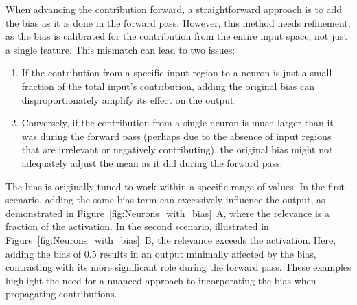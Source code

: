 When advancing the contribution forward, a straightforward approach is to add the bias as it is done in the forward pass. However, this method needs refinement, as the bias is calibrated for the contribution from the entire input space, not just a single feature. This mismatch can lead to two issues:
\begin{enumerate}
    \item If the contribution from a specific input region to a neuron is just a small fraction of the total input's contribution, adding the original bias can disproportionately amplify its effect on the output.
    \item Conversely, if the contribution from a single neuron is much larger than it was during the forward pass (perhaps due to the absence of input regions that are irrelevant or negatively contributing), the original bias might not adequately adjust the mean as it did during the forward pass.
\end{enumerate}


The bias is originally tuned to work within a specific range of values. In the first scenario, adding the same bias term can excessively influence the output, as demonstrated in Figure~\ref{fig:Neurons_with_bias}~A, where the relevance is a fraction of the activation. In the second scenario, illustrated in Figure~\ref{fig:Neurons_with_bias}~B, the relevance exceeds the activation. Here, adding the bias of 0.5 results in an output minimally affected by the bias, contrasting with its more significant role during the forward pass. These examples highlight the need for a nuanced approach to incorporating the bias when propagating contributions.

